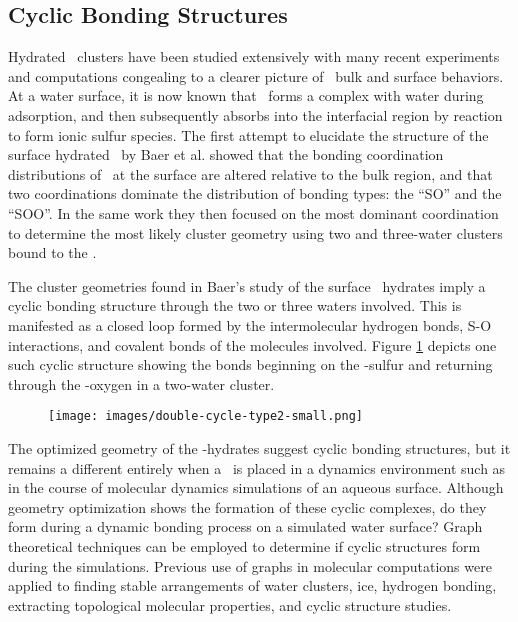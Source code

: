\subsection {Cyclic Bonding Structures}

Hydrated \suldiox~clusters have been studied extensively with many recent experiments and computations congealing to a clearer picture of \suldiox~bulk and surface behaviors.\cite{Baer2010, Tarbuck2005, Tarbuck2006, Ota2011, Bishenden1998, Hirabayashi2006, Steudel2009, Yang2002, Hayashi1985, Moin2011, Eckl2008} At a water surface, it is now known that \suldiox~forms a complex with water during adsorption, and then subsequently absorbs into the interfacial region by reaction to form ionic sulfur species.\cite{Tarbuck2005, Tarbuck2006, Ota2011} The first attempt to elucidate the structure of the surface hydrated \suldiox~by Baer et al. showed that the bonding coordination distributions of \suldiox~at the surface are altered relative to the bulk region, and that two coordinations dominate the distribution of bonding types: the ``SO'' and the ``SOO''. In the same work they then focused on the most dominant coordination to determine the most likely cluster geometry using two and three-water clusters bound to the \suldiox.

The cluster geometries found in Baer's study of the surface \suldiox~hydrates imply a cyclic bonding structure through the two or three waters involved. This is manifested as a closed loop formed by the intermolecular hydrogen bonds, S-O interactions, and covalent bonds of the molecules involved. Figure \ref{fig:cyclic-example} depicts one such cyclic structure showing the bonds beginning on the \suldiox-sulfur and returning through the \suldiox-oxygen in a two-water cluster.

\begin{figure}[h!]
	\begin{center}
		\texttt{[image: images/double-cycle-type2-small.png]}
		\caption{}
		\label{fig:cyclic-example}
	\end{center}
\end{figure}

The optimized geometry of the \suldiox-hydrates suggest cyclic bonding structures, but it remains a different entirely when a \suldiox~is placed in a dynamics environment such as in the course of molecular dynamics simulations of an aqueous surface. Although geometry optimization shows the formation of these cyclic complexes, do they form during a dynamic bonding process on a simulated water surface? Graph theoretical techniques can be employed to determine if cyclic structures form during the simulations. Previous use of graphs in molecular computations were applied to finding stable arrangements of water clusters, ice, hydrogen bonding, extracting topological molecular properties, and cyclic structure studies.\cite{Anick2002, Huber2007, Radhakrishnan1991, Shi2005, Garcia2004, McDonald1998}

